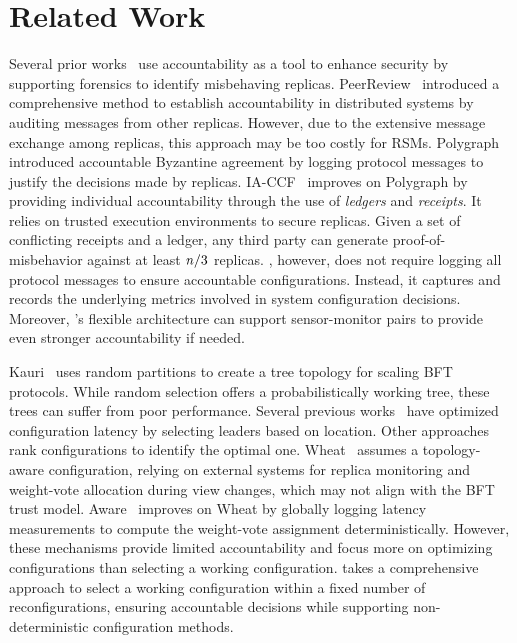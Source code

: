 \section{Related Work}

Several prior works~\cite{p2p-acc, network-acc} use accountability as a tool to enhance security by supporting forensics to identify misbehaving replicas.
PeerReview~\cite{peerreview} introduced a comprehensive method to establish accountability in distributed systems by auditing messages from other replicas.
However, due to the extensive message exchange among replicas, this approach may be too costly for RSMs.
Polygraph~\cite{polygraph} introduced accountable Byzantine agreement by logging protocol messages to justify the decisions made by replicas.
IA-CCF~\cite{ia-ccf} improves on Polygraph by providing individual accountability through the use of \textit{ledgers} and \textit{receipts}.
It relies on trusted execution environments to secure replicas.
Given a set of conflicting receipts and a ledger, any third party can generate proof-of-misbehavior against at least $\mathit{n}/3$ replicas.
\sysname, however, does not require logging all protocol messages to ensure accountable configurations.
Instead, it captures and records the underlying metrics involved in system configuration decisions.
Moreover, \sysname's flexible architecture can support sensor-monitor pairs to provide even stronger accountability if needed.

Kauri~\cite{kauri} uses random partitions to create a tree topology for scaling BFT protocols.
While random selection offers a probabilistically working tree, these trees can suffer from poor performance.
Several previous works~\cite{archer, droopy, mencius} have optimized configuration latency by selecting leaders based on location.
Other approaches~\cite{wheat, aware, eval} rank configurations to identify the optimal one.
Wheat~\cite{wheat} assumes a topology-aware configuration, relying on external systems for replica monitoring and weight-vote allocation during view changes, which may not align with the BFT trust model.
Aware~\cite{aware} improves on Wheat by globally logging latency measurements to compute the weight-vote assignment deterministically.
However, these mechanisms provide limited accountability and focus more on optimizing configurations than selecting a working configuration.
\sysname takes a comprehensive approach to select a working configuration within a fixed number of reconfigurations, ensuring accountable decisions while supporting non-deterministic configuration methods.

